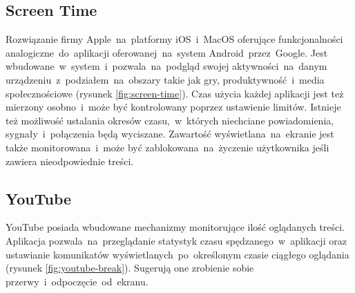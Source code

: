 \subsection{Screen Time}
\label{sec:screen_time}
Rozwiązanie firmy Apple~na~platformy iOS~i~MacOS oferujące funkcjonalności analogiczne~do~aplikacji  oferowanej~na~system Android~przez~Google. Jest wbudowane~w~system~i~pozwala~na~podgląd swojej aktywności~na~danym urządzeniu~z~podziałem~na~obszary takie jak gry, produktywność~i~media społecznościowe (rysunek \ref{fig:screen-time}). Czas użycia każdej aplikacji jest też mierzony osobno~i~może być kontrolowany poprzez ustawienie limitów. Istnieje też możliwość ustalania okresów czasu,~w~których niechciane powiadomienia, sygnały~i~połączenia będą wyciszane. Zawartość wyświetlana~na~ekranie jest także monitorowana~i~może być zablokowana~na~życzenie użytkownika jeśli zawiera nieodpowiednie treści.

\bigskip
{}

\subsection{YouTube}
\label{sec:youtube}
YouTube posiada wbudowane mechanizmy monitorujące ilość oglądanych treści. Aplikacja pozwala~na~przeglądanie statystyk czasu spędzanego~w~aplikacji oraz ustawianie komunikatów wyświetlanych~po~określonym czasie ciągłego oglądania (rysunek \ref{fig:youtube-break}). Sugerują one zrobienie sobie przerwy~i~odpoczęcie~od~ekranu.

\bigskip
{}
